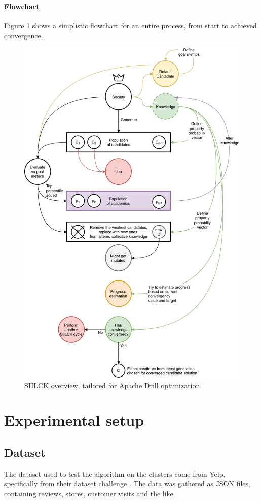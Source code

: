 \documentclass[a4paper,english]{report}
\begin{document}
			\paragraph{Flowchart}
			Figure \ref{fig:sys_overview} shows a simplistic flowchart for an entire process, from start to achieved convergence.
			\begin{figure}[H]
				\centering
				\includegraphics[width=330pt]{overview}
				\caption{SIILCK overview, tailored for Apache Drill optimization.}
				\label{fig:sys_overview}
			\end{figure}
			\clearpage
			
		\section{Experimental setup}
			\subsection{Dataset}
				The dataset used to test the algorithm on the clusters come from Yelp, specifically from their dataset challenge \cite{yelp}. The data was gathered as JSON files, containing reviews, stores, customer visits and the like.
\end{document}
